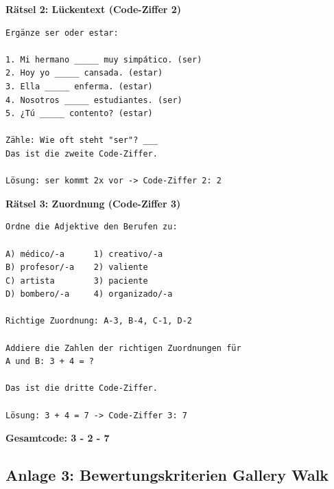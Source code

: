 \documentclass[11pt,a4paper]{article}
\begin{document}
\textbf{Rätsel 2: Lückentext (Code-Ziffer 2)}

\begin{verbatim}
Ergänze ser oder estar:

1. Mi hermano _____ muy simpático. (ser)
2. Hoy yo _____ cansada. (estar)
3. Ella _____ enferma. (estar)
4. Nosotros _____ estudiantes. (ser)
5. ¿Tú _____ contento? (estar)

Zähle: Wie oft steht "ser"? ___
Das ist die zweite Code-Ziffer.

Lösung: ser kommt 2x vor -> Code-Ziffer 2: 2
\end{verbatim}

\textbf{Rätsel 3: Zuordnung (Code-Ziffer 3)}

\begin{verbatim}
Ordne die Adjektive den Berufen zu:

A) médico/-a      1) creativo/-a
B) profesor/-a    2) valiente
C) artista        3) paciente
D) bombero/-a     4) organizado/-a

Richtige Zuordnung: A-3, B-4, C-1, D-2

Addiere die Zahlen der richtigen Zuordnungen für
A und B: 3 + 4 = ?

Das ist die dritte Code-Ziffer.

Lösung: 3 + 4 = 7 -> Code-Ziffer 3: 7
\end{verbatim}

\textbf{Gesamtcode: 3 - 2 - 7}

\subsection{Anlage 3: Bewertungskriterien Gallery Walk}
\end{document}
